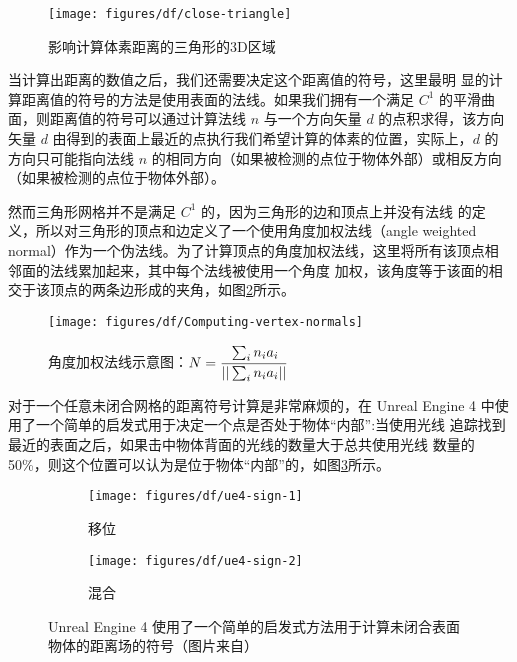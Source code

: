 \begin{figure}
	\sidecaption
	\texttt{[image: figures/df/close-triangle]}
	\caption{影响计算体素距离的三角形的3D区域}
	\label{f:df-close-triangle}
\end{figure}

当计算出距离的数值之后，我们还需要决定这个距离值的符号，这里最明 显的计算距离值的符号的方法是使用表面的法线。如果我们拥有一个满足 $C^{1}$ 的平滑曲面，则距离值的符号可以通过计算法线 $n$ 与一个方向矢量 $d$ 的点积求得，该方向矢量 $d$ 由得到的表面上最近的点执行我们希望计算的体素的位置，实际上，$d$ 的方向只可能指向法线 $n$ 的相同方向（如果被检测的点位于物体外部）或相反方向（如果被检测的点位于物体外部）。

然而三角形网格并不是满足 $C^{1}$ 的，因为三角形的边和顶点上并没有法线 的定义，所以\cite{a:3d-distance-fields-a-survey}对三角形的顶点和边定义了一个使用角度加权法线（angle weighted normal）作为一个伪法线。为了计算顶点的角度加权法线，这里将所有该顶点相邻面的法线累加起来，其中每个法线被使用一个角度 加权，该角度等于该面的相交于该顶点的两条边形成的夹角，如图\ref{f:df-Computing-vertex-normals}所示。

\begin{figure}
	\sidecaption
	\texttt{[image: figures/df/Computing-vertex-normals]}
	\caption{角度加权法线示意图：$N=\cfrac{\sum_in_i a_i}{||\sum_in_ia_i||}$}
	\label{f:df-Computing-vertex-normals}
\end{figure}

对于一个任意未闭合网格的距离符号计算是非常麻烦的，在 Unreal Engine 4 中使用了一个简单的启发式用于决定一个点是否处于物体“内部”:当使用光线 追踪找到最近的表面之后，如果击中物体背面的光线的数量大于总共使用光线 数量的 50\%，则这个位置可以认为是位于物体“内部”的，如图\ref{f:df-ue4-sign}所示。

\begin{figure}
	\begin{subfigure}[b]{0.5\textwidth}
		\texttt{[image: figures/df/ue4-sign-1]}
		\caption{移位}
	\end{subfigure}
	\begin{subfigure}[b]{0.5\textwidth}
		\texttt{[image: figures/df/ue4-sign-2]}
		\caption{混合}
	\end{subfigure}
	\caption{Unreal Engine 4 使用了一个简单的启发式方法用于计算未闭合表面物体的距离场的符号（图片来自\cite{a:Dynamicocclusionwithsigneddistancefields}）}
	\label{f:df-ue4-sign}
\end{figure}




